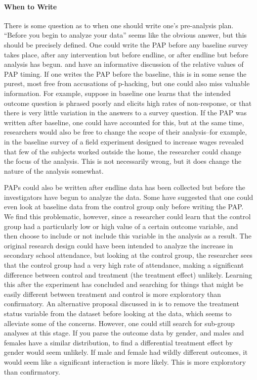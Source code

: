 \documentclass[12pt] {article}
\begin{document}
\paragraph{When to Write}
There is some question as to when one should write one's pre-analysis plan. ``Before you begin to analyze your data'' seems like the obvious answer, but this should be precisely defined. One could write the PAP before any baseline survey takes place, after any intervention but before endline, or after endline but before analysis has begun. \cite{glennerster_running_2013} and \cite{OlkenPAP} have an informative discussion of the relative values of PAP timing. If one writes the PAP before the baseline, this is in some sense the purest, most free from accusations of p-hacking, but one could also miss valuable information. For example, suppose in baseline one learns that the intended outcome question is phrased poorly and elicits high rates of non-response, or that there is very little variation in the answers to a survey question. If the PAP was written after baseline, one could have accounted for this, but at the same time, researchers would also be free to change the scope of their analysis--for example, in the baseline survey of a field experiment designed to increase wages revealed that few of the subjects worked outside the home, the researcher could change the focus of the analysis. This is not necessarily wrong, but it does change the nature of the analysis somewhat.

PAPs could also be written after endline data has been collected but before the investigators have begun to analyze the data. Some have suggested that one could even look at baseline data from the control group only before writing the PAP. We find this problematic, however, since a researcher could learn that the control group had a particularly low or high value of a certain outcome variable, and then choose to include or not include this variable in the analysis as a result. The original research design could have been intended to analyze the increase in secondary school attendance, but looking at the control group, the researcher sees that the control group had a very high rate of attendance, making a significant difference between control and treatment (the treatment effect) unlikely. Learning this after the experiment has concluded and searching for things that might be easily different between treatment and control is more exploratory than confirmatory. An alternative proposal discussed in \cite{OlkenPAP} is to remove the treatment status variable from the dataset before looking at the data, which seems to alleviate some of the concerns. However, one could still search for sub-group analyses at this stage. If you parse the outcome data by gender, and males and females have a similar distribution, to find a differential treatment effect by gender would seem unlikely. If male and female had wildly different outcomes, it would seem like a significant interaction is more likely. This is more exploratory than confirmatory. 
\end{document}
